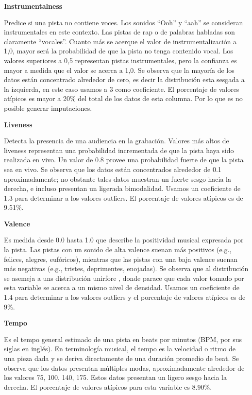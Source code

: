 \documentclass[
  letterpaper,
  DIV=11,
  numbers=noendperiod]{scrartcl}
\begin{document}
\textbf{Instrumentalness}

Predice si una pista no contiene voces. Los sonidos ``Ooh'' y ``aah'' se
consideran instrumentales en este contexto. Las pistas de rap o de
palabras habladas son claramente ``vocales''. Cuanto más se acerque el
valor de instrumentalización a 1,0, mayor será la probabilidad de que la
pista no tenga contenido vocal. Los valores superiores a 0,5 representan
pistas instrumentales, pero la confianza es mayor a medida que el valor
se acerca a 1,0. Se observa que la mayoría de los datos están
concentrado alrededor de cero, es decir la distribución esta sesgada a
la izquierda, en este caso usamos a 3 como coeficiente. El porcentaje de
valores atípicos es mayor a 20\% del total de los datos de esta columna.
Por lo que es no posible generar imputaciones.

\textbf{Liveness}

Detecta la presencia de una audiencia en la grabación. Valores más altos
de liveness representan una probabilidad incrementada de que la pista
haya sido realizada en vivo. Un valor de 0.8 provee una probabilidad
fuerte de que la pista sea en vivo. Se observa que los datos están
concentrados alrededor de 0.1 aproximadamente; no obstante tales datos
muestran un fuerte sesgo hacia la derecha, e incluso presentan un
ligerada bimodalidad. Usamos un coeficiente de 1.3 para determinar a los
valores outliers. El porcentaje de valores atípicos es de 9.51\%.

\textbf{Valence}

Es medida desde 0.0 hasta 1.0 que describe la positividad musical
expresada por la pista. Las pistas con un sonido de alta valence suenan
más positivos (e.g., felices, alegres, eufóricos), mientras que las
pistas con una baja valence suenan más negativas (e.g., tristes,
deprimentes, enojadas). Se observa que al distribución se asemeja a uns
distribución unirfore , donde parace que cada valor tomado por esta
variable se acerca a un mismo nivel de densidad. Usamos un coeficiente
de 1.4 para determinar a los valores outliers y el porcentaje de valores
atípicos es de 9\%.

\textbf{Tempo}

Es el tempo general estimado de una pista en beats por minutos (BPM, por
sus siglas en inglés). En terminología musical, el tempo es la velocidad
o ritmo de una pieza dada y se deriva directamente de una duración
promedio de beat. Se observa que los datos presentan múltiples modas,
aproximadamente alrededor de los valores 75, 100, 140, 175. Estos datos
presentan un ligero sesgo hacia la derecha. El porcentaje de valores
atípicos para esta variable es 8.90\%.
\end{document}
